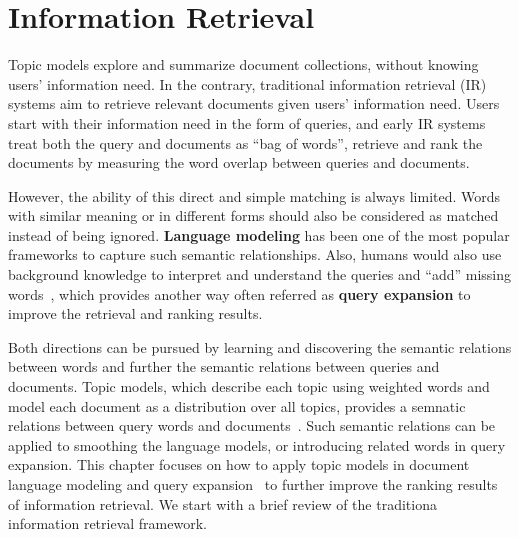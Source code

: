 \chapter{Information Retrieval}
\label{ch:ir}

Topic models explore and summarize document collections, without
knowing users' information need. In the contrary, traditional
information retrieval (IR) systems aim to retrieve relevant documents
given users' information need. Users start with their information need
in the form of queries, and early IR systems treat both the query and
documents as ``bag of words'', retrieve and rank the documents by
measuring the word overlap between queries and documents.


However, the ability of this direct and simple matching is always
limited. Words with similar meaning or in different forms should also
be considered as matched instead of being ignored. \textbf{Language
  modeling} has been one of the most popular frameworks to capture
such semantic relationships. Also, humans would also use background
knowledge to interpret and understand the queries and ``add'' missing
words~\citep{wei-07}, which provides another way often referred as
\textbf{query expansion} to improve the retrieval and ranking results.

Both directions can be pursued by learning and discovering the
semantic relations between words and further the semantic relations
between queries and documents. Topic models, which describe each topic
using weighted words and model each document as a distribution over
all topics, provides a semnatic relations between query words and
documents~\citep{deerwester-90,hofmann-99a}. Such semantic relations
can be applied to smoothing the language models, or introducing
related words in query expansion. This chapter focuses on how to apply
topic models in document language modeling \citep{Lu-2011,wei-06} and
query expansion~\citep{Park-2009,Andrzejewski-2011} to further improve
the ranking results of information retrieval. We start with a brief
review of the traditiona information retrieval framework.


